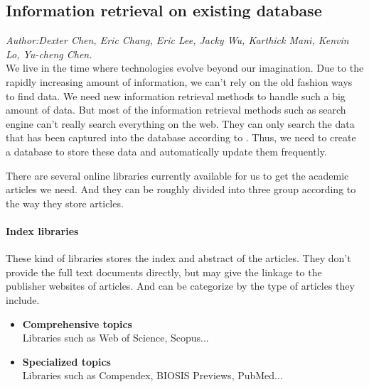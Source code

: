 	
\subsection{Information retrieval on existing database}
\textit{\footnotesize Author:Dexter Chen, Eric Chang, Eric Lee, Jacky Wu, Karthick Mani, Kenvin Lo, Yu-cheng Chen.}\\

We live in the time where technologies evolve beyond our imagination. Due to the rapidly increasing amount of information, we can't rely on the old fashion ways to find data. We need new information retrieval methods to handle such a big amount of data. But most of the information retrieval methods such as search engine can't really search everything on the web. They can only search the data that has been captured into the database according to \cite{Grehan2002}. Thus, we need to create a database to store these data and automatically update them frequently.

There are several online libraries currently available for us to get the academic articles we need. And they can be roughly divided into three group according to the way they store articles.
\paragraph{Index libraries}
	These kind of libraries stores the index and abstract of the articles. They don't provide the full text documents directly, but may give the linkage to the publisher websites of articles. And can be categorize by the type of articles they include.
	\begin{itemize}
		\item\textbf{Comprehensive topics}\\Libraries such as Web of Science, Scopus...
		\item\textbf{Specialized topics}\\Libraries such as Compendex, BIOSIS Previews, PubMed...
	\end{itemize}
